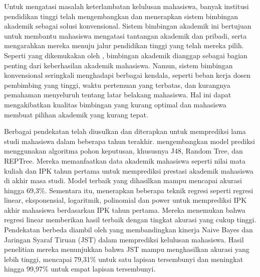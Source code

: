 Untuk mengatasi masalah keterlambatan kelulusan mahasiswa, banyak institusi pendidikan tinggi telah mengembangkan dan menerapkan sistem bimbingan akademik sebagai solusi konvensional. Sistem bimbingan akademik ini bertujuan untuk membantu mahasiswa mengatasi tantangan akademik dan pribadi, serta mengarahkan mereka menuju jalur pendidikan tinggi yang telah mereka pilih. Seperti yang dikemukakan oleh \cite{elcullada2018academic}, bimbingan akademik dianggap sebagai bagian penting dari keberhasilan akademik mahasiswa. Namun, sistem bimbingan konvensional seringkali menghadapi berbagai kendala, seperti beban kerja dosen pembimbing yang tinggi, waktu pertemuan yang terbatas, dan kurangnya pemahaman menyeluruh tentang latar belakang mahasiswa. Hal ini dapat mengakibatkan kualitas bimbingan yang kurang optimal dan mahasiswa membuat pilihan akademik yang kurang tepat. 

Berbagai pendekatan telah diusulkan dan diterapkan untuk memprediksi lama studi mahasiswa dalam beberapa tahun terakhir. \cite{alyahyan2020decision} mengembangkan model prediksi menggunakan algoritma pohon keputusan, khususnya J48, Random Tree, dan REPTree. Mereka memanfaatkan data akademik mahasiswa seperti nilai mata kuliah dan IPK tahun pertama untuk memprediksi prestasi akademik mahasiswa di akhir masa studi. Model terbaik yang dihasilkan mampu mencapai akurasi hingga 69,3\%. Sementara itu, \cite{danbatta2020predicting} menerapkan beberapa teknik regresi seperti regresi linear, eksponensial, logaritmik, polinomial dan power untuk memprediksi IPK akhir mahasiswa berdasarkan IPK tahun pertama. Mereka menemukan bahwa regresi linear memberikan hasil terbaik dengan tingkat akurasi yang cukup tinggi. Pendekatan berbeda diambil oleh \cite{olalekan2020performance} yang membandingkan kinerja Naive Bayes dan Jaringan Syaraf Tiruan (JST) dalam memprediksi kelulusan mahasiswa. Hasil penelitian mereka menunjukkan bahwa JST mampu menghasilkan akurasi yang lebih tinggi, mencapai 79,31\% untuk satu lapisan tersembunyi dan meningkat hingga 99,97\% untuk empat lapisan tersembunyi.

